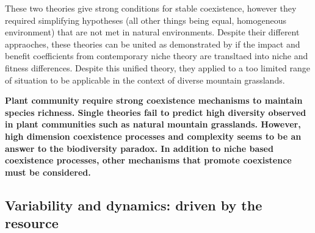 These two theories give strong conditions for stable coexistence, however they required simplifying hypotheses (all other things being equal, homogeneous environment) that are not met in natural environments. Despite their different appraoches, these theories can be united as demonstrated by  \cite{letten_linking_2017} if the impact and benefit coefficients from contemporary niche theory are transltaed into niche and fitness differences. Despite this unified theory, they applied to a too limited range of situation to be applicable in the context of diverse mountain grasslands.
%
%
%
%
%






\textbf{Plant community require strong coexistence mechanisms to maintain species richness. Single theories fail to predict high diversity observed in plant communities such as natural mountain grasslands. However, high dimension coexistence processes and complexity seems to be an answer to the biodiversity paradox. In addition to niche based coexistence processes, other mechanisms that promote coexistence must be considered.}




 \subsection{Variability and dynamics: driven by the resource}


